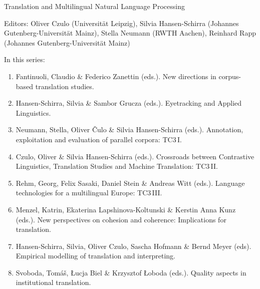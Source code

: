 {\large Translation and Multilingual Natural Language Processing}

\bigskip

Editors: Oliver Czulo (Universität Leipzig),
Silvia Hansen-Schirra (Johannes Gutenberg-Universität Mainz),
Stella Neumann (RWTH Aachen),
Reinhard Rapp (Johannes Gutenberg-Universität Mainz)

\bigskip

In this series:

\begin{enumerate}
\item Fantinuoli, Claudio \& Federico Zanettin (eds.). New directions in corpus-based translation studies.
\item Hansen-Schirra, Silvia \& Sambor Grucza (eds.). Eyetracking and Applied Linguistics.
\item Neumann, Stella, Oliver Čulo \& Silvia Hansen-Schirra (eds.). Annotation, exploitation and evaluation of parallel corpora: TC3\,I.
\item Czulo, Oliver  \& Silvia Hansen-Schirra (eds.). Crossroads between Contrastive Linguistics, Translation Studies and Machine Translation: TC3\,II.
\item Rehm, Georg, Felix Sasaki, Daniel Stein \& Andreas Witt (eds.). Language technologies for a multilingual Europe: TC3\,III.
\item Menzel, Katrin, Ekaterina Lapshinova-Koltunski \& Kerstin Anna Kunz  (eds.). New perspectives on cohesion and coherence: Implications for translation.
\item Hansen-Schirra, Silvia, Oliver Czulo, Sascha Hofmann \& Bernd Meyer (eds). Empirical modelling of translation and interpreting.
\item Svoboda, Tomáš, Łucja Biel \& Krzysztof Łoboda (eds.). Quality aspects in institutional translation.
\end{enumerate}



